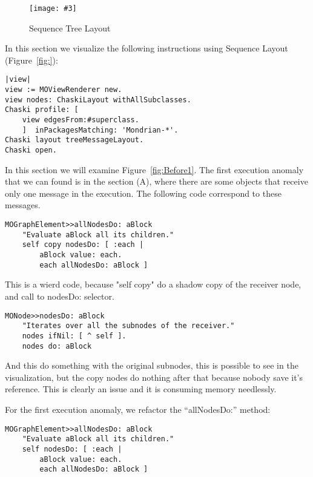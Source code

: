 \documentclass{sig-alternate}
\newcommand{\largefig}[4]{
	\begin{figure*}[#1]
		\centering
		\texttt{[image: \#3]}
		\caption{\label{fig:#3}#4}
	\end{figure*}}
\newcommand{\figref}[1]{Figure~\ref{fig:#1}}
\begin{document}
\largefig{}{1.0}{MondrianSequenceLayout}{Sequence Tree Layout}
In this section we visualize the following instructions using Sequence Layout (\figref{}):
\begin{lstlisting}[language=Smalltalk]
|view|
view := MOViewRenderer new.
view nodes: ChaskiLayout withAllSubclasses.
Chaski profile: [
	view edgesFrom:#superclass.
	]  inPackagesMatching: 'Mondrian-*'.
Chaski layout treeMessageLayout.
Chaski open.
\end{lstlisting}

In this section we will examine \figref{Before1}. The first execution anomaly that we can found is in the section (A), where there are some objects that receive only one message in the execution. The following code correspond to these messages.

\begin{lstlisting}[language=Smalltalk]
MOGraphElement>>allNodesDo: aBlock
	"Evaluate aBlock all its children."
	self copy nodesDo: [ :each |
		aBlock value: each.
		each allNodesDo: aBlock ]
\end{lstlisting} 

This is a wierd code, because "self copy" do a shadow copy of the receiver node, and call to nodesDo: selector.

\begin{lstlisting}[language=Smalltalk]
MONode>>nodesDo: aBlock
	"Iterates over all the subnodes of the receiver."	
	nodes ifNil: [ ^ self ].
	nodes do: aBlock
\end{lstlisting} 

And this do something with the original subnodes, this is possible to see in the visualization, but the copy nodes do nothing after that because nobody save it's reference. This is clearly an issue  and it is consuming memory needlessly.

For the first execution anomaly, we refactor the ``allNodesDo:'' method: 
\begin{lstlisting}[language=Smalltalk]
MOGraphElement>>allNodesDo: aBlock
	"Evaluate aBlock all its children."
	self nodesDo: [ :each |
		aBlock value: each.
		each allNodesDo: aBlock ]
\end{lstlisting} 
\end{document}
